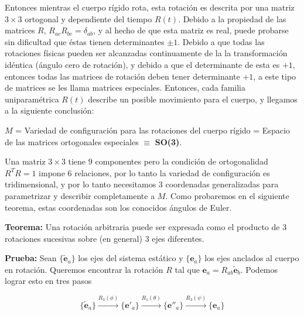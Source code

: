 \documentclass[a4paper,10pt]{article}
\numberwithin{equation}{section}
\newcommand{\teorema}{\textbf{Teorema: }}
\newcommand{\prueba}{\textbf{Prueba: }}
\begin{document}
\vspace{.3cm}

Entonces mientras el cuerpo rígido rota, esta rotación es descrita por una matriz 
$3\times 3$ ortogonal y dependiente del tiempo $R(t)$. Debido a la propiedad de 
las matrices $R$, $R_{ac}R_{bc} = \delta_{ab}$, y al hecho de que esta matriz es 
real, puede probarse sin dificultad que éstas tienen determinantes $\pm 1$. Debido 
a que todas las rotaciones físicas pueden ser alcanzadas continuamente de la 
la transformación idéntica (ángulo cero de rotación), y debido a que el determinante 
de esta es $+1$, entonces todas las matrices de rotación deben tener determinante $+1$, 
a este tipo de matrices se les llama matrices especiales. Entonces, cada familia uniparamétrica $R(t)$ describe un posible movimiento para 
el cuerpo, y llegamos a la siguiente conclusión:

\begin{center}
 $M$ = Variedad de configuración para  las rotaciones del cuerpo rígido = Espacio de las matrices 
 ortogonales especiales $\equiv$ \textbf{SO(3)}.
\end{center}

\vspace{.3cm}

Una matriz $3\times 3$ tiene $9$ componentes pero la condición de ortogonalidad $R^TR=1$
impone $6$ relaciones, por lo tanto la variedad de configuración es tridimensional, y 
por lo tanto necesitamos $3$ coordenadas generalizadas para parametrizar y describir 
completamente a $M$. Como probaremos en el siguiente teorema, estas coordenadas son 
los conocidos ángulos de Euler.

\vspace{.3cm}

\teorema Una rotación arbitraria puede ser expresada como el producto de $3$ rotaciones 
sucesivas sobre (en general) $3$ ejes diferentes.

\vspace{.3cm}

\prueba Sean $\{{\tilde{\mathbf{e}}_a\}}$ los ejes del sistema estático y 
$\{{\mathbf{e}_a\}}$ los ejes anclados al cuerpo en rotación. Queremos encontrar 
la rotación $R$ tal que $\mathbf{e}_a = R_{ab}{\tilde{\mathbf{e}}_b}$. Podemos 
lograr esto en tres pasos

\begin{equation}
 \{{\tilde{\mathbf{e}}_a\}} \xrightarrow{R_3(\phi)} 
 \{{\mathbf{e}'_a\}} \xrightarrow{R_1(\theta)} 
 \{{\mathbf{e}''_a\}} \xrightarrow{R_3(\psi)} \{{\mathbf{e}_a\}}
\end{equation}
\end{document}
